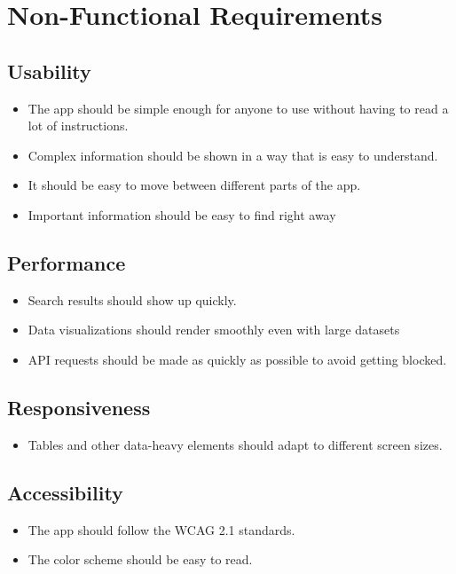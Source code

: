 \section{Non-Functional Requirements}
\subsection{Usability}
\begin{itemize}
    \item The app should be simple enough for anyone to use without having to read a lot of instructions.
    \item Complex information should be shown in a way that is easy to understand.
    \item It should be easy to move between different parts of the app.
    \item Important information should be easy to find right away
\end{itemize}

\subsection{Performance}
\begin{itemize}
    \item Search results should show up quickly.
    \item Data visualizations should render smoothly even with large datasets
    \item API requests should be made as quickly as possible to avoid getting blocked.
\end{itemize}

\subsection{Responsiveness}
\begin{itemize}
    \item Tables and other data-heavy elements should adapt to different screen sizes.
\end{itemize}

\subsection{Accessibility}
\begin{itemize}
    \item The app should follow the WCAG 2.1 standards.
    \item The color scheme should be easy to read.
\end{itemize}